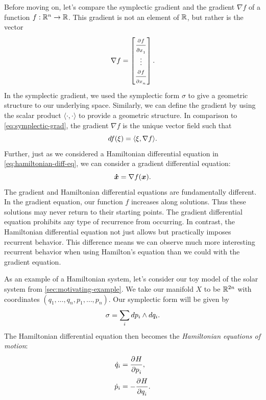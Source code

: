 \documentclass[twoside,letterpaper,11pt]{article}
\numberwithin{equation}{section}
\begin{document}
Before moving on, let's compare the symplectic gradient and the gradient $\nabla
f$ of a function $f : \mathbb{R}^n \to \mathbb{R}$.
This gradient is not an element of $\mathbb{R}$, but rather is the vector
\begin{equation*}
  \nabla f =
  \begin{bmatrix}
    \frac{\strut\partial^{}f}{\strut\partial x_1^{}}\\
    \vdots\\
    \frac{\strut\partial^{}f}{\strut\partial x_n^{}}
  \end{bmatrix}.
\end{equation*}
In the symplectic gradient, we used the symplectic form $\sigma$ to give a
geometric structure to our underlying space.
Similarly, we can define the gradient by using the scalar product $\langle
\cdot, \cdot \rangle$ to provide a geometric structure.
In comparison to \cref{eq:symplectic-grad}, the gradient $\nabla f$ is the
unique vector field such that
\begin{equation*}
  \mathop{}\!d f(\xi) = \langle \xi, \nabla f \rangle.
\end{equation*}
Further, just as we considered a Hamiltonian differential equation in
\cref{eq:hamiltonian-diff-eq}, we can consider a gradient differential equation:
\begin{equation*}
  \bm{\dot{x}} = \nabla f(\bm{x}).
\end{equation*}
The gradient and Hamiltonian differential equations are fundamentally different.
In the gradient equation, our function $f$ increases along solutions.
Thus these solutions may never return to their starting points.
The gradient differential equation prohibits any type of recurrence from
occurring.
In contrast, the Hamiltonian differential equation not just allows but
practically imposes recurrent behavior.
This difference means we can observe much more interesting recurrent behavior
when using Hamilton's equation than we could with the gradient equation.

As an example of a Hamiltonian system, let's consider our toy model of the solar
system from \cref{sec:motivating-example}.
We take our manifold $X$ to be $\mathbb{R}^{2n}$ with coordinates $(q_1, \ldots, q_n,
p_1, \ldots, p_n)$.
Our symplectic form will be given by
\begin{equation*}
  \sigma = \sum_{i} \mathop{}\!d p_i \wedge \mathop{}\!d q_i.
\end{equation*}
The Hamiltonian differential equation then becomes the \emph{Hamiltonian
  equations of motion}:
\begin{equation}
  \label{eq:hamiltonian-motion-eq}
  \begin{aligned}
    \dot{q}_i &= \frac{\strut\partial^{}H}{\strut\partial p_i^{}},\\
    \dot{p}_i &= - \frac{\strut\partial^{}H}{\strut\partial q_i^{}}.
  \end{aligned}
\end{equation}
\end{document}
